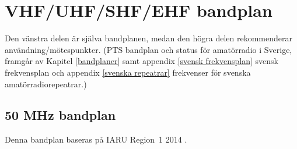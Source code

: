 \section{VHF/UHF/SHF/EHF bandplan}
\label{Bandplan VHF och högre}

Den vänstra delen är själva bandplanen, medan den högra delen rekommenderar
användning/mötespunkter.
(PTS bandplan och status för amatörradio i Sverige, framgår av Kapitel
\ref{bandplaner} samt appendix \ref{svensk frekvensplan} svensk frekvensplan och
appendix \ref{svenska repeatrar} frekvenser för svenska amatörradiorepeatrar.)

\subsection{50 MHz bandplan}
\label{50MHZbandplan}
Denna bandplan baseras på IARU Region~1 2014 \cite{IARU1}.

